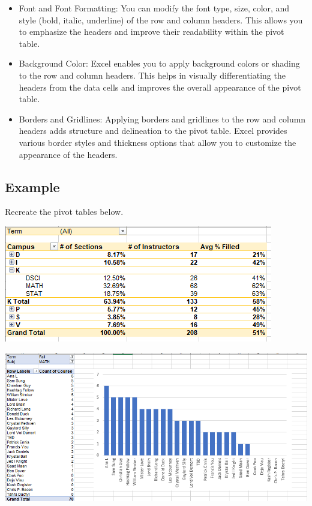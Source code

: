 \documentclass[
]{book}
\begin{document}
\begin{itemize}
\item
  Font and Font Formatting: You can modify the font type, size, color, and style (bold, italic, underline) of the row and column headers. This allows you to emphasize the headers and improve their readability within the pivot table.
\item
  Background Color: Excel enables you to apply background colors or shading to the row and column headers. This helps in visually differentiating the headers from the data cells and improves the overall appearance of the pivot table.
\item
  Borders and Gridlines: Applying borders and gridlines to the row and column headers adds structure and delineation to the pivot table. Excel provides various border styles and thickness options that allow you to customize the appearance of the headers.
\end{itemize}

\hypertarget{example-4}{%
\subsection{Example}\label{example-4}}

Recreate the pivot tables below.

\includegraphics{PT7.png}

\includegraphics{PT8.png}
\end{document}
